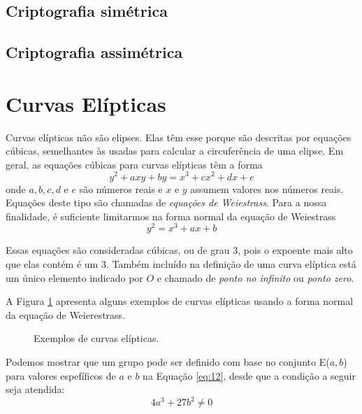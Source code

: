 %
%
\subsection{Criptografia simétrica}

%
%
\subsection{Criptografia assimétrica}

%
%
\section{Curvas Elípticas}
Curvas elípticas não são elipses. Elas têm esse porque são descritas por equações cúbicas, semelhantes às usadas para calcular a circuferência de uma elipse. Em geral, as equações cúbicas para curvas elípticas têm a forma
\begin{equation}
y^2 + axy + by = x^3 + cx^2 + dx + e \label{eq:11}
\end{equation}
onde \(a, b, c, d\) e \(e\) são números reais e \(x\) e \(y\) assumem valores nos números reais. Equações deste tipo são chamadas de \textit{equações de Weiestrass}. Para a nossa finalidade, é suficiente limitarmos na forma normal da equação de Weiestrass
\begin{equation}
y^2 = x^3 + ax + b \label{eq:12}
\end{equation}

Essas equações são consideradas cúbicas, ou de grau 3, pois o expoente mais alto que elas contém é um 3. Também incluído na definição de uma curva elíptica está um único elemento indicado por \(O\) e chamado de \textit{ponto no infinito} ou \textit{ponto zero}.

A Figura \ref{fig:curvas} apresenta alguns exemplos de curvas elípticas usando a forma normal da equação de Weierestrass.

\begin{figure}[h!]
\begin{center}
\end{center}
\caption{Exemplos de curvas elípticas.}
\label{fig:curvas}
\end{figure}

Podemos mostrar que um grupo pode ser definido com base no conjunto E(\(a, b\)) para valores espefíficos de \(a\) e \(b\) na Equação \ref{eq:12}, desde que a condição a seguir seja atendida:
\begin{equation}
4a^3 + 27b^2 \neq 0 \label{eq:13}
\end{equation}

